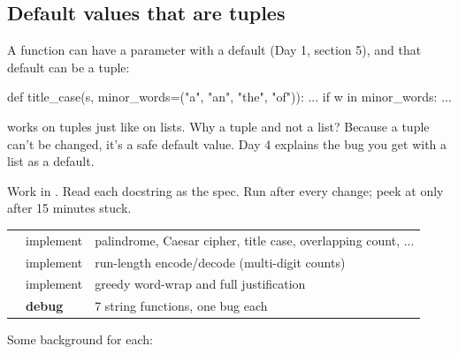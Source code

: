 \documentclass[10pt,a4paper]{article}
\begin{document}
\subsection{Default values that are tuples}
A function can have a parameter with a default (Day 1, section 5), and that default can be a tuple:
\begin{pycode}
def title_case(s, minor_words=("a", "an", "the", "of")):
    ...
    if w in minor_words: ...
\end{pycode}
 works on tuples just like on lists. Why a tuple and not a list? Because a tuple can’t be changed, it’s a safe default value. Day 4 explains the bug you get with a list as a default.
\begin{practicebox}
Work in . Read each docstring as the spec. Run  after every change; peek at  only after 15 minutes stuck.
\end{practicebox}
\begin{datatable}{}{\footnotesize}
\begin{xltabular}{\linewidth}{@{}Y{1.33}Y{0.58}Y{1.09}@{}}
 &  &  \\ \hline
\endhead
{} & implement & palindrome, Caesar cipher, title case, overlapping count, ... \\
 & implement & run-length encode/decode (multi-digit counts) \\
 & implement & greedy word-wrap and full justification \\
 & \textbf{debug} & 7 string functions, one bug each \\
\hline
\end{xltabular}
\end{datatable}
Some background for each:
\end{document}
